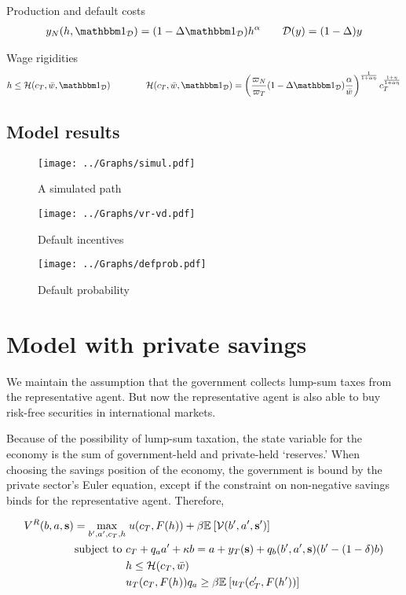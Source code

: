 Production and default costs
\begin{align}
	y_N(h, \ind_\mathcal{D}) = (1 - \Delta \ind_\mathcal{D}) h^\alpha \qquad \mathcal{D}(y) = (1-\Delta) y
\end{align}

Wage rigidities
\begin{align}
	h \leq \mathcal{H}(c_T, \bar{w}, \ind_\mathcal{D}) \qquad\qquad \mathcal{H}(c_T, \bar{w}, \ind_\mathcal{D}) = \left(\frac{\varpi_N}{\varpi_T} (1 - \Delta \ind_\mathcal{D}) \frac{\alpha}{\bar{w}}\right)^\frac{1}{1+\alpha\eta} c_T^\frac{1+\eta}{1+\alpha\eta}
\end{align}


\subsection{Model results}

\begin{figure}[!hbtp]\centering
	\texttt{[image: ../Graphs/simul.pdf]}
	\caption{A simulated path}
\end{figure}

\begin{figure}[!hbtp]\centering
	\texttt{[image: ../Graphs/vr-vd.pdf]}
	\caption{Default incentives}
\end{figure}

\begin{figure}[!hbtp]\centering
	\texttt{[image: ../Graphs/defprob.pdf]}
	\caption{Default probability}
\end{figure}

\section{Model with private savings}
We maintain the assumption that the government collects lump-sum taxes from the representative agent. But now the representative agent is also able to buy risk-free securities in international markets.

Because of the possibility of lump-sum taxation, the state variable for the economy is the sum of government-held and private-held `reserves.' When choosing the savings position of the economy, the government is bound by the private sector's Euler equation, except if the constraint on non-negative savings binds for the representative agent. Therefore,

\begin{align}
	V^R(b,a,\text{\textbf{s}}) = \max_{b', a', c_T, h} &\; u(c_T, F(h)) + \beta \mathbb{E}_{{}}\left[ \mathcal{V}(b',a',\text{\textbf{s}}') \right] \\
	\text{subject to }
	& c_T + q_a a' + \kappa b = a + y_T(\text{\textbf{s}}) + q_b(b',a',\text{\textbf{s}}) (b' - (1-\delta) b) \notag\\
	& h \leq \mathcal{H}(c_T, \bar{w}) \notag\\
	& u_T(c_T, F(h)) q_a \geq \beta \mathbb{E}_{{}}\left[ u_T(c_T', F(h')) \right]\notag
\end{align}

